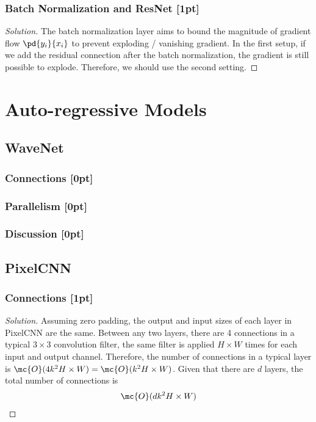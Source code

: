 \documentclass{article}
\begin{document}
	\subsubsection{Batch Normalization and ResNet [1pt]}
	\begin{proof}[Solution]
		The batch normalization layer aims to bound the magnitude of gradient flow $\pd{y_i}{x_i}$ to prevent exploding / vanishing gradient. In the first setup, if we add the residual connection after the batch normalization, the gradient is still possible to explode. Therefore, we should use the second setting.
	\end{proof}
	
	\section{Auto-regressive Models}
	\subsection{WaveNet}
	\subsubsection{Connections [0pt]}
	
	\subsubsection{Parallelism [0pt]}
	
	\subsubsection{Discussion [0pt]}
	
	\subsection{PixelCNN}
	\subsubsection{Connections [1pt]}
	\begin{proof}[Solution]
		Assuming zero padding, the output and input sizes of each layer in PixelCNN are the same. Between any two layers, there are 4 connections in a typical $3 \times 3$ convolution filter, the same filter is applied $H \times W$ times for each input and output channel. Therefore, the number of connections in a typical layer is $\mc{O}(4 k^2 H \times W) = \mc{O}(k^2 H \times W)$. Given that there are $d$ layers, the total number of connections is
		\begin{align}
			\mc{O}(d k^2 H \times W)
		\end{align}
	\end{proof}
	
\end{document}
